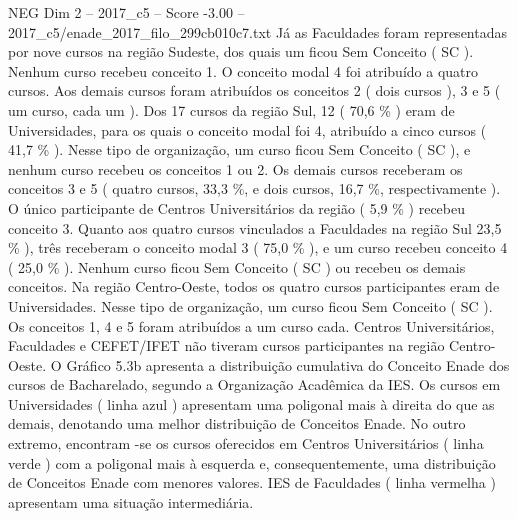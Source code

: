 \begin{textsample}{NEG Dim 2 – 2017\_c5 – Score -3.00 – 2017\_c5/enade\_2017\_filo\_299cb010c7.txt}
Já as Faculdades foram representadas por nove cursos na região Sudeste, dos quais um ficou Sem Conceito ( SC ).
Nenhum curso recebeu conceito 1.
O conceito modal 4 foi atribuído a quatro cursos.
Aos demais cursos foram atribuídos os conceitos 2 ( dois cursos ), 3 e 5 ( um curso, cada um ).
Dos 17 cursos da região Sul, 12 ( 70,6 \% ) eram de Universidades, para os quais o conceito modal foi 4, atribuído a cinco cursos ( 41,7 \% ).
Nesse tipo de organização, um curso ficou Sem Conceito ( SC ), e nenhum curso recebeu os conceitos 1 ou 2.
Os demais cursos receberam os conceitos 3 e 5 ( quatro cursos, 33,3 \%, e dois cursos, 16,7 \%, respectivamente ).
O único participante de Centros Universitários da região ( 5,9 \% ) recebeu conceito 3.
Quanto aos quatro cursos vinculados a Faculdades na região Sul 23,5 \% ), três receberam o conceito modal 3 ( 75,0 \% ), e um curso recebeu conceito 4 ( 25,0 \% ).
Nenhum curso ficou Sem Conceito ( SC ) ou recebeu os demais conceitos.
Na região Centro-Oeste, todos os quatro cursos participantes eram de Universidades.
Nesse tipo de organização, um curso ficou Sem Conceito ( SC ).
Os conceitos 1, 4 e 5 foram atribuídos a um curso cada.
Centros Universitários, Faculdades e CEFET/IFET não tiveram cursos participantes na região Centro-Oeste.
O Gráfico 5.3b apresenta a distribuição cumulativa do Conceito Enade dos cursos de Bacharelado, segundo a Organização Acadêmica da IES.
Os cursos em Universidades ( linha azul ) apresentam uma poligonal mais à direita do que as demais, denotando uma melhor distribuição de Conceitos Enade.
No outro extremo, encontram -se os cursos oferecidos em Centros Universitários ( linha verde ) com a poligonal mais à esquerda e, consequentemente, uma distribuição de Conceitos Enade com menores valores.
IES de Faculdades ( linha vermelha ) apresentam uma situação intermediária.

\end{textsample}

